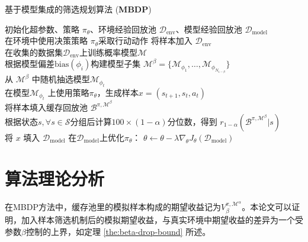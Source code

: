 \begin{algorithm}[tb]
\caption{基于模型集成的筛选规划算法 (\textbf{MBDP})}
\label{algo:our-method}
\begin{algorithmic}
\STATE 初始化超参数、策略 $\pi_\theta$、环境经验回放池 $\mathcal{D}_{\mathrm{env}}$、模型经验回放池 $\mathcal{D}_{\mathrm{model}}$\\
    \STATE 在环境中使用决策策略 $\pi_\theta$采取行动动作
    \STATE 将样本加入 $\mathcal{D}_{\mathrm{env}}$\\
        \STATE  在收集的数据集$\mathcal{D}_{\mathrm{env}}$上训练概率模型$\mathcal{M}$\\
        \STATE 根据模型偏差$\mathrm{bias}({\phi_i})$构建模型子集 $\mathcal{M}^\beta = \{\mathcal{M}_{\phi_1},\ldots,\mathcal{M}_{\phi_{N_{1-\beta}}}\}$\\
            \STATE 从 $\mathcal{M}^\beta$ 中随机抽选模型$\mathcal{M}_{\phi_t}$\\
            \STATE 在模型$\mathcal{M}_{\phi_t}$ 上使用策略$\pi_\theta$，生成样本$x=\left(s_{t+1},s_t,a_t\right)$ \\
            \STATE 将样本填入缓存回放池 $\mathcal{B}^{\pi,\mathcal{M}^\beta}$\\
        \ENDFOR
        \STATE 根据状态$s, \forall s\in\mathcal{S}$分组后计算$100\times(1-\alpha)$分位数，得到 $r_{1-\alpha}(\mathcal{B}^{\pi,\mathcal{M}^\beta}|s)$\\
                \STATE 将 $x$ 填入 $\mathcal{D}_{\mathrm{model}}$
            \ENDIF
        \ENDFOR
    \ENDFOR
    \STATE 在$\mathcal{D}_{\mathrm{model}}$上优化$\pi_\theta$： $\theta\leftarrow \theta - \lambda\nabla_\theta J_\theta(\mathcal{D}_{\mathrm{model}})$
\ENDFOR
\end{algorithmic}
\end{algorithm}

\section{算法理论分析}

在MBDP方法中，缓存池里的模拟样本构成的期望收益记为${V}^{\pi,\mathcal{M}^\alpha}_\beta$。本论文可以证明，加入样本筛选机制后的模拟期望收益，与真实环境中期望收益的差异为一个受参数$\beta$控制的上界，如定理 \ref{the:beta-drop-bound} 所述。


